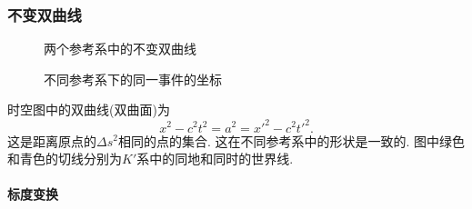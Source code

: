 \documentclass[hidelinks]{ctexart}
\begin{document}

\subsubsection{不变双曲线} %
\label{ssub:不变双曲线}

\begin{figure}[ht]
    \centering
    \caption{两个参考系中的不变双曲线}
\end{figure}
\begin{figure}[ht]
    \centering
    \caption{不同参考系下的同一事件的坐标}
    \label{fig:不同参考系下的同一事件的坐标}
\end{figure}
时空图中的双曲线(双曲面)为
\[ x^2 - c^2t^2 = a^2 = x'^2 - c^2t'^2. \]
这是距离原点的$\Delta s^2$相同的点的集合. 这在不同参考系中的形状是一致的. 图中绿色和青色的切线分别为$K'$系中的同地和同时的世界线.

\paragraph{标度变换} %
\label{par:标度变换}
\end{document}

